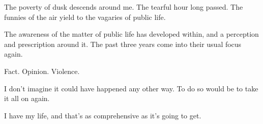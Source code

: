 

The poverty of dusk descends around me.  The tearful hour long passed.
The funnies of the air yield to the vagaries of public life.

The awareness of the matter of public life has developed within, and a
perception and prescription around it.  The past three years come into
their usual focus again.

Fact.  Opinion.  Violence.

I don't imagine it could have happened any other way.  To do so would
be to take it all on again.    

I have my life, and that's as comprehensive as it's going to get.


\bye
